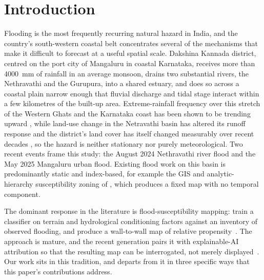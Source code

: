 \documentclass[journal]{IEEEtran}
\begin{document}
\section{Introduction}
\label{sec:intro}

Flooding is the most frequently recurring natural hazard in India, and the
country's south-western coastal belt concentrates several of the mechanisms that
make it difficult to forecast at a useful spatial scale. Dakshina Kannada
district, centred on the port city of Mangaluru in coastal Karnataka, receives
more than \SI{4000}{\milli\metre} of rainfall in an average monsoon, drains two
substantial rivers, the Nethravathi and the Gurupura, into a shared estuary, and
does so across a coastal plain narrow enough that fluvial discharge and tidal
stage interact within a few kilometres of the built-up area. Extreme-rainfall
frequency over this stretch of the Western Ghats and the Karnataka coast has been
shown to be trending upward \citep{chandrashekar2018}, while land-use change in
the Netravathi basin has altered its runoff response
\citep{chandana2023,babar2015} and the district's land cover has itself changed
measurably over recent decades \citep{naik2022}, so the hazard is neither
stationary nor purely meteorological. Two recent events frame this study: the
August 2024 Nethravathi river flood and the May 2025 Mangaluru urban flood.
Existing flood work on this basin is predominantly static and index-based, for
example the GIS and analytic-hierarchy susceptibility zoning of
\citet{nirmala2026}, which produces a fixed map with no temporal component.

The dominant response in the literature is flood-susceptibility mapping: train a
classifier on terrain and hydrological conditioning factors against an inventory
of observed flooding, and produce a wall-to-wall map of relative
propensity~\citep{tehrany2014,khosravi2018,arabameri2019,saha2021}. The approach
is mature, and the recent generation pairs it with explainable-AI attribution so
that the resulting map can be interrogated, not merely
displayed~\citep{lundberg2017,aydin2022,seydi2023}. Our work sits in this
tradition, and departs from it in three specific ways that this paper's
contributions address.
\end{document}
